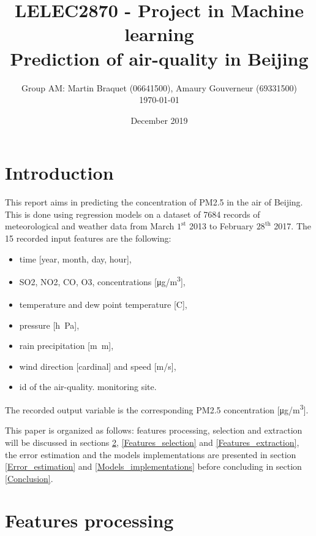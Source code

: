 \documentclass[journal,11pt]{IEEEtran}
\title{LELEC2870 - Project in Machine learning\\\vspace*{10pt} \Large Prediction of air-quality in Beijing}
\author{Group AM: Martin Braquet (06641500), Amaury Gouverneur (69331500)\\\vspace*{10pt} \normalsize \today{}}
\date{December 2019}
\begin{document}
\maketitle

\section{Introduction}

This report aims in predicting the concentration of PM2.5 in the air of Beijing. This is done using regression models on a dataset of 7684 records of meteorological and weather data from March $1^{\text{st}}$ 2013 to February $28^{\text{th}}$ 2017. The 15 recorded input features are the following:
\begin{itemize}
    \item time [year, month, day, hour],
    \item SO2, NO2, CO, O3, concentrations [\si{\micro g/m^3}],
    \item temperature and dew point temperature [\si{C^\degree}],
    \item pressure [\si{h \pascal}],
    \item rain precipitation [\si{m m}],
    \item wind direction [cardinal] and speed [\si{m/s}],
    \item id of the air-quality. monitoring site.
\end{itemize}
The recorded output variable is the corresponding PM2.5 concentration [\si{\micro g/m^3}].

This paper is organized as follows: features processing, selection and extraction will be discussed in sections \ref{Features_processing}, \ref{Features_selection} and \ref{Features_extraction}, the error estimation and the models implementations are presented in section \ref{Error_estimation} and \ref{Models_implementations} before concluding in section \ref{Conclusion}. 

\section{Features processing}
\label{Features_processing}
\end{document}
